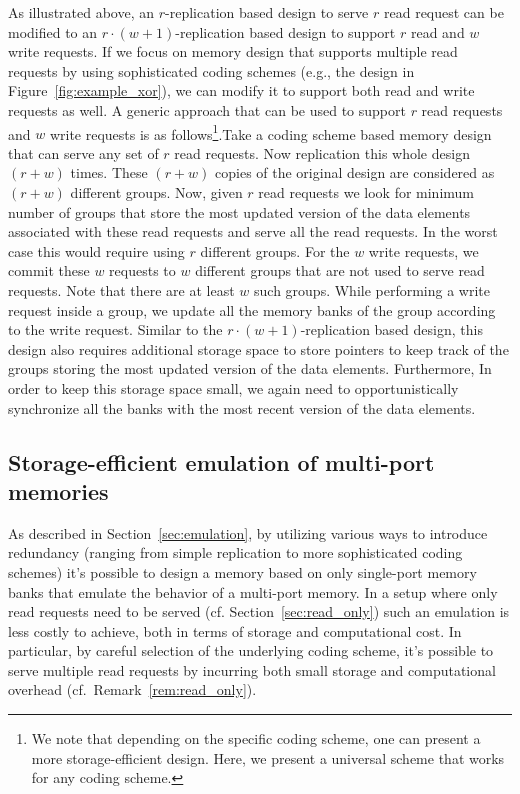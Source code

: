 \begin{remark}
\label{rem:rw}
As illustrated above, an $r$-replication based design to serve $r$ read request can be modified to an $r\cdot(w+1)$-replication based design to support $r$ read and $w$ write requests. If we focus on memory design that supports multiple read requests by using sophisticated coding schemes (e.g., the design in Figure~\ref{fig:example_xor}), we can modify it to support both read and write requests as well. A generic approach that can be used to support $r$ read requests and $w$ write requests is as follows\footnote{We note that depending on the specific coding scheme, one can present a more storage-efficient design. Here, we present a universal scheme that works for any coding scheme.}.Take a coding scheme based memory design that can serve any set of $r$ read requests. Now replication this whole design $(r + w)$ times. These $(r + w)$ copies of the original design are considered as $(r + w)$ different groups. Now, given $r$ read requests we look for minimum number of groups that store the most updated version of the data elements associated with these read requests and serve all the read requests. In the worst case this would require using $r$ different groups. For the $w$ write requests, we commit these $w$ requests to $w$ different groups that are not used to serve read requests. Note that there are at least $w$ such groups. While performing a write request inside a group, we update all the memory banks of the group according to the write request. Similar to the $r\cdot(w + 1)$-replication based design, this design also requires additional storage space to store pointers to keep track of the groups storing the most  updated version of the data elements. Furthermore, In order to keep this storage space small, we again need to opportunistically synchronize all the banks with the most recent version of the data elements.
\end{remark}

\subsection{Storage-efficient emulation of multi-port memories}
\label{sec:efficient_emulation}

As described in Section~\ref{sec:emulation}, by utilizing various ways to introduce redundancy (ranging from simple replication to more sophisticated coding schemes) it's possible to design a memory based on only single-port memory banks that emulate the behavior of a multi-port memory. In a setup where only read requests need to be served (cf. Section~\ref{sec:read_only}) such an emulation is less costly to achieve, both in terms of storage and computational cost. In particular, by careful selection of the underlying coding scheme, it's possible to serve multiple read requests by incurring both small storage and computational overhead (cf.~Remark~\ref{rem:read_only}). 

